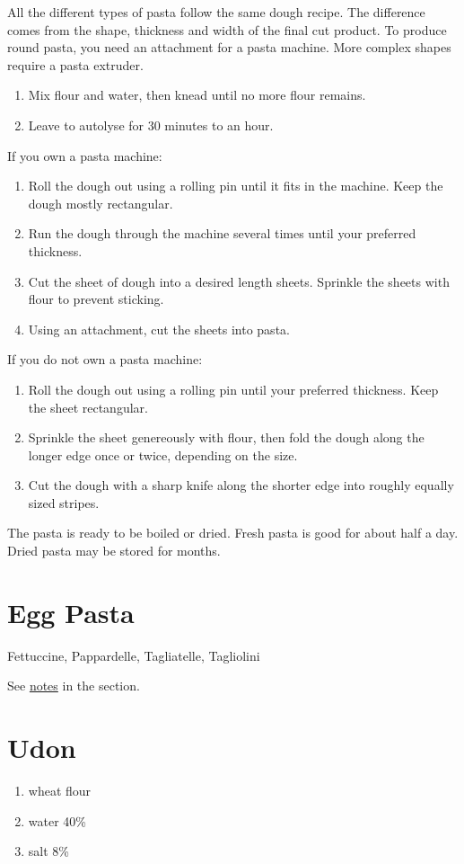 All the different types of pasta follow the same dough recipe. The difference
comes from the shape, thickness and width of the final cut product. To produce
round pasta, you need an attachment for a pasta machine. More complex shapes
require a pasta extruder.
\begin{enumerate}
  \item Mix flour and water, then knead until no more flour remains.
  \item Leave to autolyse for 30 minutes to an hour.
  \saveenum
\end{enumerate}
If you own a pasta machine:
\begin{enumerate}
  \contenum
  \item Roll the dough out using a rolling pin until it fits in the machine.
    Keep the dough mostly rectangular.
  \item Run the dough through the machine several times until your preferred
    thickness.
  \item Cut the sheet of dough into a desired length sheets. Sprinkle the
    sheets with flour to prevent sticking.
  \item Using an attachment, cut the sheets into pasta.
\end{enumerate}
If you do not own a pasta machine:
\begin{enumerate}
  \contenum
  \item Roll the dough out using a rolling pin until your preferred thickness.
    Keep the sheet rectangular.
  \item Sprinkle the sheet genereously with flour, then fold the dough along
    the longer edge once or twice, depending on the size.
  \item Cut the dough with a sharp knife along the shorter edge into roughly
    equally sized stripes.
\end{enumerate}
The pasta is ready to be boiled or dried. Fresh pasta is good for about half a
day. Dried pasta may be stored for months.

\section{Egg Pasta} \label{egg-pasta}
Fettuccine, Pappardelle, Tagliatelle, Tagliolini

See \hyperref[eggless-pasta-notes]{notes} in the  section.

\section{Udon} \label{udon}
\begin{enumerate}
  \item wheat flour
  \item water 40\%
  \item salt 8\%
\end{enumerate}

